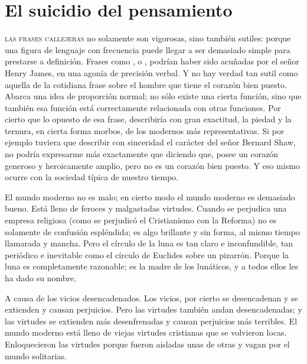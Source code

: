 \chapter{El suicidio del pensamiento}%
\label{cha:El suicidio del pensamiento}

\textsc{las frases callejeras} no solamente son vigorosas, sino también sutiles: porque una figura de
lenguaje con frecuencia puede llegar a ser demasiado simple para prestarse a definición. Frases como
, o , podrían haber sido acuñadas por el señor Henry James, en una agonía
de precisión verbal. Y no hay verdad tan sutil como aquella de la cotidiana frase sobre el hombre que
tiene el corazón bien puesto. Abarca una idea de proporción normal; no sólo existe una cierta función,
sino que también esa función está correctamente relacionada con otras funciones. Por cierto que lo
opuesto de esa frase, describiría con gran exactitud, la piedad y la ternura, en cierta forma morbos, de los
modernos más representativas. Si por ejemplo tuviera que describir con sinceridad el carácter del señor
Bernard Shaw, no podría expresarme más exactamente que diciendo que, posee un corazón generoso y
heroicamente amplio, pero no es un corazón bien puesto. Y eso mismo ocurre con la sociedad típica de
nuestro tiempo.

El mundo moderno no es malo; en cierto modo el mundo moderno es demasiado bueno. Está lleno
de feroces y malgastadas virtudes. Cuando se perjudica una empresa religiosa (como se perjudicó el
Cristianismo con la Reforma) no es solamente de confusión espléndida; es algo brillante y sin forma, al
mismo tiempo llamarada y mancha. Pero el círculo de la luna es tan claro e inconfundible, tan periódico e
inevitable como el círculo de Euclides sobre un pizarrón. Porque la luna es completamente razonable; es
la madre de los lunáticos, y a todos ellos les ha dado su nombre.

A causa de los vicios desencadenados. Los vicios, por cierto se desencadenan y se extienden y
causan perjuicios. Pero las virtudes también andan desencadenadas; y las virtudes se extienden más
desenfrenadas y causan perjuicios más terribles. El mundo moderno está lleno de viejas virtudes cristianas
que se volvieron locas. Enloquecieron las virtudes porque fueron aisladas unas de otras y vagan por el
mundo solitarias.

